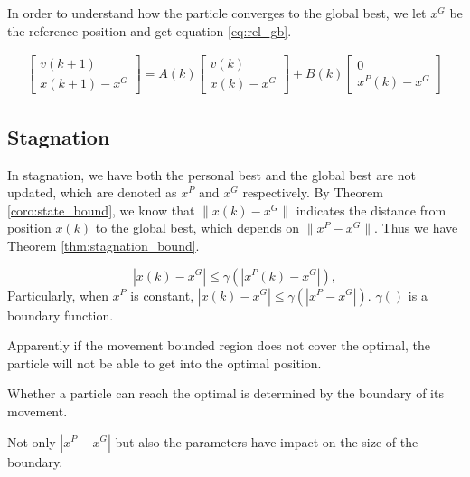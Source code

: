 In order to understand how the particle converges to the global best, we let $ x^{G} $ be the reference position and get equation \eqref{eq:rel_gb}.

\begin{equation}
\label{eq:rel_gb}
\begin{aligned}
\begin{bmatrix}
v(k+1) \\
x(k+1) - x^{G}
\end{bmatrix}
 = A(k) 
\begin{bmatrix}
v(k) \\
x(k) - x^{G}
\end{bmatrix}
+ B(k) 
\begin{bmatrix}
0 \\
x^{P}(k) - x^{G}
\end{bmatrix}
\end{aligned}
\end{equation}

\subsection{Stagnation}

In stagnation, we have both the personal best and the global best are not updated, which are denoted as $ x^{P} $ and $ x^{G} $ respectively.
By Theorem \ref{coro:state_bound}, we know that $ \lVert x(k) - x^{G} \rVert $ indicates the distance from position $ x(k) $ to the global best, which depends on  $ \lVert x^{P} - x^{G} \rVert $.
Thus we have Theorem \ref{thm:stagnation_bound}.

\begin{mythm}
\label{thm:stagnation_bound}
\begin{equation}
| x(k) - x^{G} | \leq \gamma ( | x^{P}(k) - x^{G} | ), 
\end{equation}
Particularly, when $ x^{P} $ is constant,
$  | x(k) - x^{G} | \leq \gamma ( | x^{P} - x^{G} | ). $
$ \gamma () $ is a boundary function.
\end{mythm}

Apparently if the movement bounded region does not cover the optimal, the particle will not be able to get into the optimal position.

\begin{myprop}
\label{prop:particle:nonoptimal}
Whether a particle can reach the optimal is determined by the boundary of its movement.
\end{myprop}

Not only $ | x^{P} - x^{G} | $ but also the parameters have impact on the size of the boundary.

